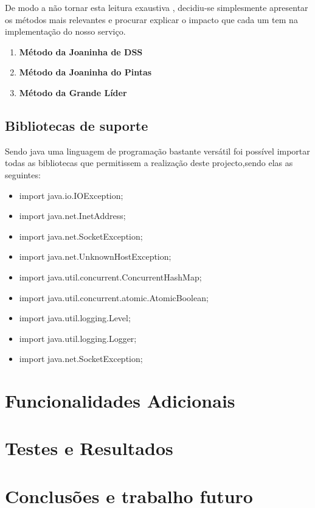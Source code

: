 \documentclass{article}
\begin{document}
De modo a não tornar esta leitura exaustiva , decidiu-se simplesmente apresentar os métodos mais relevantes
e procurar explicar o impacto que cada um tem na implementação do nosso serviço.

\begin{enumerate}

\item \textbf{Método da Joaninha de DSS}
\item \textbf{Método da Joaninha do Pintas}
\item \textbf{Método da Grande Líder}

\end{enumerate}

\subsection{Bibliotecas de suporte}

Sendo java uma linguagem de programação bastante versátil foi possível importar todas as bibliotecas que permitissem a realização 
deste projecto,sendo elas as seguintes:

\begin{itemize}
\item{import java.io.IOException;}
\item{import java.net.InetAddress;}
\item{import java.net.SocketException;}
\item{import java.net.UnknownHostException;}
\item{import java.util.concurrent.ConcurrentHashMap;}
\item{import java.util.concurrent.atomic.AtomicBoolean;}
\item{import java.util.logging.Level;}
\item{import java.util.logging.Logger;}
\item{import java.net.SocketException;}
\end{itemize}

\newpage


\section{Funcionalidades Adicionais}


\newpage
\section{Testes e Resultados}


\newpage
\section{Conclusões e trabalho futuro}
\end{document}
